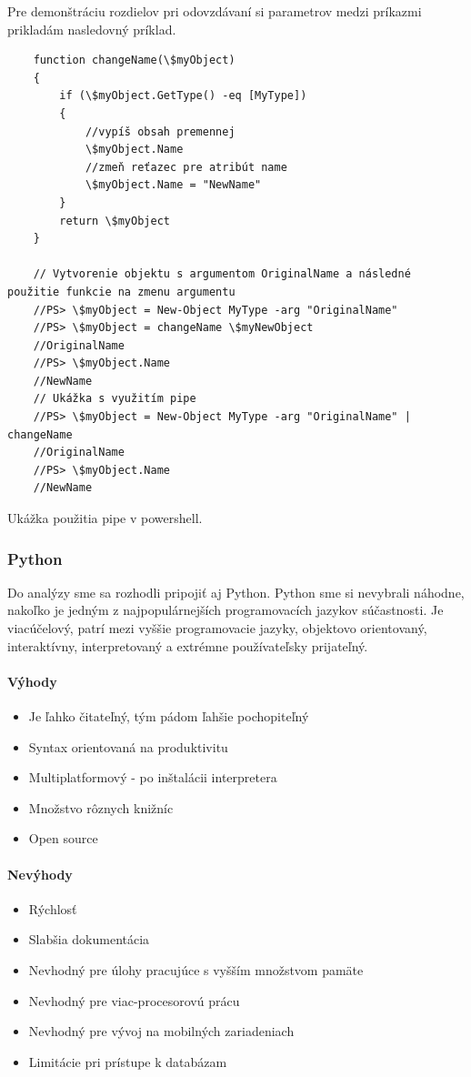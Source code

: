 Pre demonštráciu rozdielov pri odovzdávaní si parametrov medzi príkazmi prikladám nasledovný príklad.
\newpage
\begin{algorithm}
	\begin{verbatim}
	function changeName(\$myObject)
	{
		if (\$myObject.GetType() -eq [MyType])
		{
			//vypíš obsah premennej
			\$myObject.Name
			//zmeň reťazec pre atribút name
			\$myObject.Name = "NewName"
		}
		return \$myObject
	}
	
	// Vytvorenie objektu s argumentom OriginalName a následné použitie funkcie na zmenu argumentu
	//PS> \$myObject = New-Object MyType -arg "OriginalName"
	//PS> \$myObject = changeName \$myNewObject
	//OriginalName
	//PS> \$myObject.Name
	//NewName
	// Ukážka s využitím pipe
	//PS> \$myObject = New-Object MyType -arg "OriginalName" | changeName
	//OriginalName
	//PS> \$myObject.Name
	//NewName
	\end{verbatim}
	\caption{Ukážka použitia pipe v powershell. \cite{netalg}}
	\label{alg:gen}
\end{algorithm}

\subsubsection{Python}
\indent Do analýzy sme sa rozhodli pripojiť aj Python. Python sme si nevybrali náhodne, nakoľko je jedným z najpopulárnejších programovacích jazykov súčastnosti. Je viacúčelový, patrí mezi vyššie programovacie jazyky, objektovo orientovaný, interaktívny, interpretovaný a extrémne používateľsky prijateľný.\cite{python}
\paragraph{Výhody}
\begin{itemize}
	\item Je ľahko čitateľný, tým pádom ľahšie pochopiteľný
	\item Syntax orientovaná na produktivitu
	\item Multiplatformový - po inštalácii interpretera
	\item Množstvo rôznych knižníc
	\item Open source
	\newline
\end{itemize}
\paragraph{Nevýhody}
\begin{itemize}
	\item Rýchlosť
	\item Slabšia dokumentácia
	\item Nevhodný pre úlohy pracujúce s vyšším množstvom pamäte
	\item Nevhodný pre viac-procesorovú prácu
	\item Nevhodný pre vývoj na mobilných zariadeniach
	\item Limitácie pri prístupe k databázam 
	\newline
\end{itemize}


